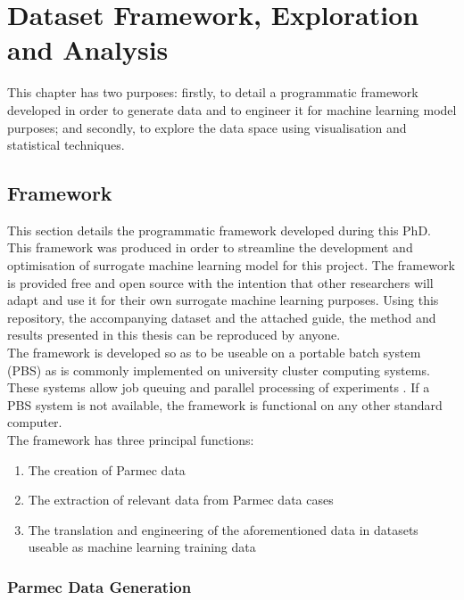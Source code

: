 \chapter{Dataset Framework, Exploration and Analysis}
\label{cha:dataset}

This chapter has two purposes: firstly, to detail a programmatic framework developed in order to generate data and to engineer it for machine learning model purposes; and secondly, to explore the data space using visualisation and statistical techniques.

\section{Framework} \label{framework}

This section details the programmatic framework \cite{Jones2018} developed during this PhD. This framework was produced in order to streamline the development and optimisation of surrogate machine learning model for this project. The framework is provided free and open source with the intention that other researchers will adapt and use it for their own surrogate machine learning purposes. Using this repository, the accompanying dataset \cite{huw_rhys_jones_2022_6967536} and the attached guide, the method and results presented in this thesis can be reproduced by anyone.
\\

\noindent
The framework is developed so as to be useable on a portable batch system (PBS) as is commonly implemented on university cluster computing systems. These systems allow job queuing and parallel processing of experiments \cite{henderson1995job}. If a PBS system is not available, the framework is functional on any other standard computer.
\\

\noindent
The framework has three principal functions:

\begin{enumerate}
	\item The creation of Parmec data 
	\item The extraction of relevant data from Parmec data cases
	\item The translation and engineering of the aforementioned data in datasets useable as machine learning training data 
\end{enumerate}

\subsection{Parmec Data Generation}

